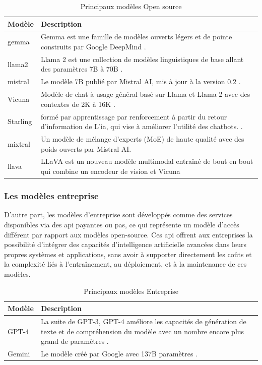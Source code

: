 \begin{table}[H]
\centering
\begin{tabular}{|l|p{12cm}|}
\hline
\textbf{Modèle} & \textbf{Description} \\ \hline
gemma & Gemma est une famille de modèles ouverts légers et de pointe construits par Google DeepMind \cite{gemma_2024}. \\ \hline
llama2  & Llama 2 est une collection de modèles linguistiques de base allant des paramètres 7B à 70B \cite{touvron2023llama}. \\ \hline
mistral & Le modèle 7B publié par Mistral AI, mis à jour à la version 0.2 \cite{jiang2023mistral}. \\ \hline
Vicuna & Modèle de chat à usage général basé sur Llama et Llama 2 avec des contextes de 2K à 16K \cite{vicuna2023}. \\ \hline
Starling & formé par apprentissage par renforcement à partir du retour d'information de L'\ac{ia}, qui vise à améliorer l'utilité des chatbots. \cite{starling2023}. \\ \hline
mixtral & Un modèle de mélange d'experts (MoE) de haute qualité avec des poids ouverts par Mistral AI. \\ \hline
llava & LLaVA est un nouveau modèle multimodal entraîné de bout en bout qui combine un encodeur de vision et Vicuna \\ \hline
\end{tabular}
\caption{Principaux modèles Open source}
\label{table:llm-models}
\end{table}


\subsubsection{Les modèles entreprise}

D'autre part, les modèles d'entreprise sont développés comme des services disponibles via des \acs{api} payantes ou pas, ce qui représente un modèle d'accès différent par rapport aux modèles open-source. Ces \acs{api} offrent aux entreprises la possibilité d'intégrer des capacités d'intelligence artificielle avancées dans leurs propres systèmes et applications, sans avoir à supporter directement les coûts et la complexité liés à l'entraînement, au déploiement, et à la maintenance de ces modèles.
 
\begin{table}[H]
\centering
\begin{tabular}{|l|p{14cm}|}
\hline
\textbf{Modèle} & \textbf{Description} \\ \hline
GPT-4 & La suite de GPT-3, GPT-4 améliore les capacités de génération de texte et de compréhension du modèle avec un nombre encore plus grand de paramètres \cite{openai2023gpt4}. \\ \hline
Gemini & Le modèle créé par Google avec 137B paramètres \cite{geminiteam2023gemini}. \\ \hline
\end{tabular}
\caption{Principaux modèles Entreprise}
\label{table:llm-models-closed}
\end{table}




